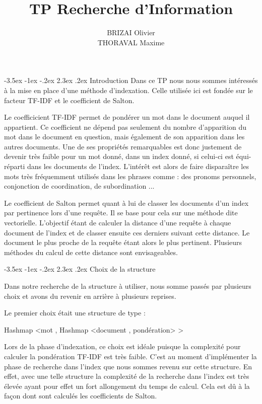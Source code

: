 \documentclass[a4paper,12pt]{article}
\makeatletter
\renewcommand\section{\@startsection {section}{1}{\z@}%
                           {-3.5ex \@plus -1ex \@minus -.2ex}%
                           {2.3ex \@plus.2ex}%
                           {\normalfont\Large\bfseries}}
\makeatother
\begin{document}
\newpage
\title{TP Recherche d'Information}
\date{}
\author{BRIZAI Olivier\\THORAVAL Maxime}
\maketitle

\newpage
\section{Introduction}
Dans ce TP nous nous sommes intéressés à la mise en place d'une méthode d'indexation. Celle utilisée ici est fondée sur le facteur TF-IDF et le coefficient de Salton.

Le coefficicient TF-IDF permet de pondérer un mot dans le document auquel il appartient. Ce coefficient ne dépend pas seulement du nombre d'apparition du mot dans le document en question, mais également de
son apparition dans les autres documents. Une de ses propriétés remarquables est donc justement de devenir très faible pour un mot donné, dans un index donné, si celui-ci est équi-réparti dans les documents de l'index. L'intérêt est alors de faire \og disparaître \fg{} les mots très fréquemment utilisés dans les phrases comme : des pronoms personnels, conjonction de coordination, de subordination ...

Le coefficient de Salton permet quant à lui de classer les documents d'un index par pertinence lors d'une requête. Il se base pour cela sur une méthode dite vectorielle. L'objectif étant de calculer la \og distance \fg{} d'une requête à chaque document de l'index et de classer ensuite ces derniers suivant cette distance. Le document le plus \og proche \fg{} de la requête étant alors le plus pertinent. Plusieurs méthodes du calcul de cette distance sont envisageables.

\section{Choix de la structure}

Dans notre recherche de la structure à utiliser, nous somme passés par plusieurs choix et avons du revenir en arrière à plusieurs reprises.

Le premier choix était une structure de type : 

Hashmap <mot , Hashmap <document , pondération> >

Lors de la phase d'indexation, ce choix est idéale puisque la complexité pour calculer la pondération TF-IDF est très faible.
C'est au moment d'implémenter la phase de recherche dans l'index que nous sommes revenu sur cette structure. En effet, avec une telle structure la complexité de la recherche dans l'index est très élevée ayant pour effet un fort allongement du temps de calcul.
Cela est dû à la façon dont sont calculés les coefficients de Salton.
\end{document}
